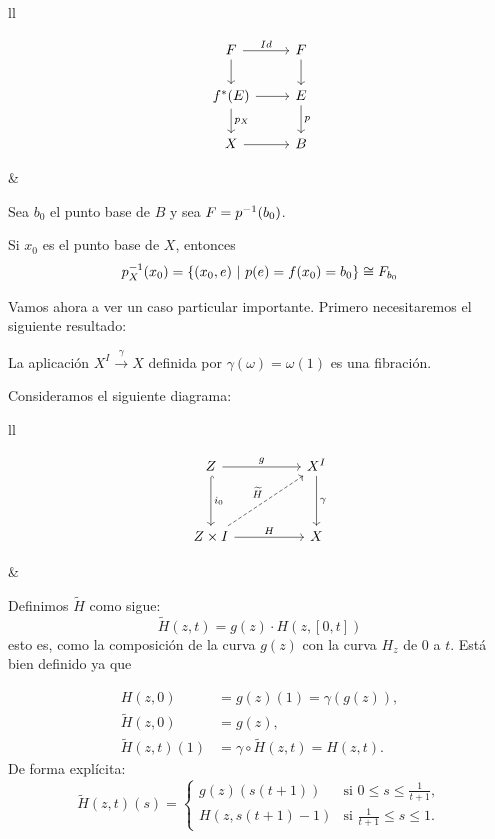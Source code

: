 \begin{tabular}{ll}
\begin{minipage}{0.3\textwidth}
\[
\begin{tikzcd}
F \rar{Id} \dar & F \dar \\
f^*(E) \rar \dar{p_X}  & E \dar{p} \\
X \rar & B
\end{tikzcd}
\]
\end{minipage}
&
\begin{minipage}{0.65\textwidth}
\begin{demo}
Sea $b_0$ el punto base de $B$ y sea $F = \nobreak p^{-1}(b_0)$. \par
Si $x_0$ es el punto base de $X$, entonces 
\[p_X^{-1}(x_0) = \nobreak \{ (x_0, e) \ \vert \ p(e) = f(x_0) = b_0\} \cong F_{b_0}\]
\end{demo}
\end{minipage}
\end{tabular}
Vamos ahora a ver un caso particular importante. Primero necesitaremos el siguiente resultado:
\begin{prop}
La aplicación $X^I \stackrel{\gamma}{\longrightarrow} X$ definida por $\gamma(\omega) = \omega(1)$ es una fibración.
\end{prop}
\begin{demo}
Consideramos el siguiente diagrama:\par
\begin{tabular}{ll}
\begin{minipage}{0.3\textwidth}
\[
\begin{tikzcd}
Z \arrow{rr}{g} \arrow[hook]{dd}{i_0} & & X^I \arrow{dd}{\gamma} \\
\\
Z \times I \arrow{rr}{H} \arrow[dashed]{uurr}{\widetilde{H}} & & X
\end{tikzcd}
\]
\end{minipage}
&
\begin{minipage}{0.65\textwidth}
Definimos $\widetilde{H}$ como sigue:
\[ \widetilde{H}(z,t) = g(z) \cdotp H(z, [0,t]) \]
esto es, como la composición de la curva $g(z)$ con la curva $H_z$ de $0$ a $t$. Está bien definido ya que

\end{minipage}
\end{tabular}
\begin{align*}
H(z,0) &= g(z)(1) = \gamma(g(z)),  \\
\widetilde{H}(z,0) &= g(z), \\
\widetilde{H}(z,t)(1) &= \gamma \circ \widetilde{H}(z,t) = H(z,t). \end{align*}
De forma explícita:
\[
\widetilde{H}(z,t)(s) = 
\begin{cases}
g(z)(s(t+1)) & \text{si } 0 \leq s \leq \frac{1}{t+1}, \\
H(z, s(t+1) -1) & \text{si } \frac{1}{t+1} \leq s \leq 1.
\end{cases}
\]
\end{demo}
